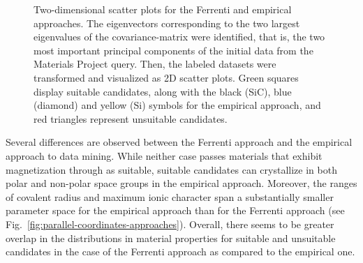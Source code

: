 \documentclass[superscriptaddress,
preprint,
 amsmath,amssymb,
 aps,
]{revtex4-2}
\newcommand{\mrk}[1]{\textcolor{red}{#1}}
\begin{document}
\begin{figure}
\begin{subfigure}{0.35\textwidth}
    \end{subfigure}
    \caption{Two-dimensional scatter plots for the Ferrenti and empirical approaches. The eigenvectors corresponding to the two largest eigenvalues of the covariance-matrix were identified, that is, the two most important principal components of the initial data from the Materials Project query. Then, the labeled datasets were transformed and visualized as 2D scatter plots. Green squares display suitable candidates, along with the black (SiC), blue (diamond) and yellow (Si) symbols for the empirical approach, and red triangles represent unsuitable candidates.}
    \label{fig:2dscatterplotpca}
\end{figure}


Several differences are observed between the Ferrenti approach and the empirical approach to data mining. While neither case passes materials that exhibit magnetization through as suitable, suitable candidates can crystallize in both polar and non-polar space groups in the empirical approach. Moreover, the ranges of covalent radius and maximum ionic character span a substantially smaller parameter space for the empirical approach than for the Ferrenti approach (see Fig.~\ref{fig:parallel-coordinates-approaches}).
Overall, there seems to be greater overlap in the distributions in material properties for suitable and unsuitable candidates in the case of the Ferrenti approach as compared to the empirical one. 
\end{document}
